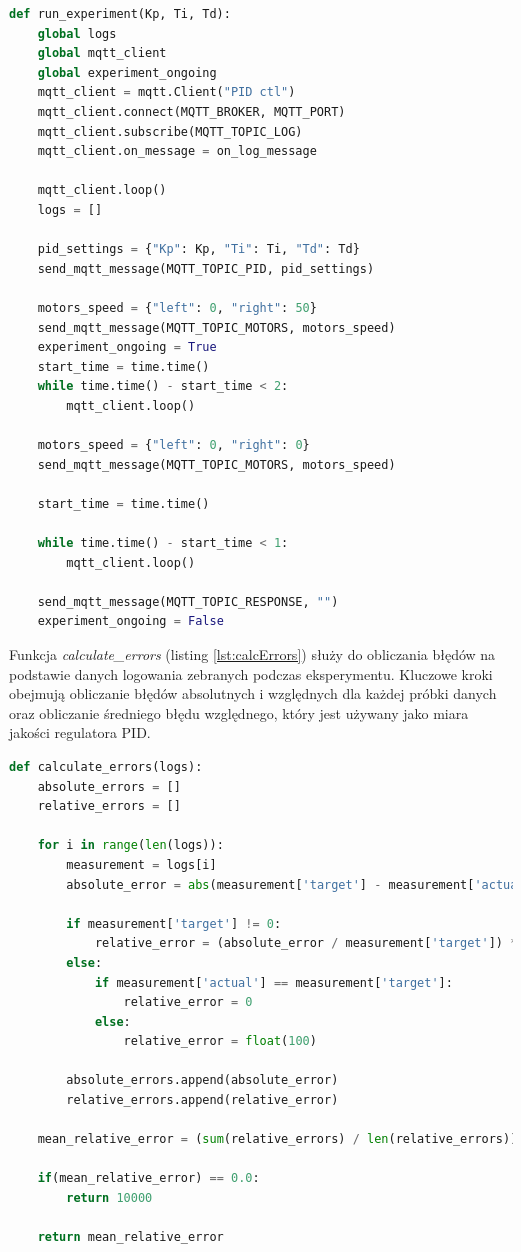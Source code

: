 \documentclass[12pt,twoside]{article}
\begin{document}
\begin{lstlisting}[language=Python, caption=Funkcja uruchamiająca eksperyment, label={lst:runExperiment}]
def run_experiment(Kp, Ti, Td):
    global logs
    global mqtt_client
    global experiment_ongoing
    mqtt_client = mqtt.Client("PID ctl")
    mqtt_client.connect(MQTT_BROKER, MQTT_PORT)
    mqtt_client.subscribe(MQTT_TOPIC_LOG)
    mqtt_client.on_message = on_log_message

    mqtt_client.loop()
    logs = []

    pid_settings = {"Kp": Kp, "Ti": Ti, "Td": Td}
    send_mqtt_message(MQTT_TOPIC_PID, pid_settings)

    motors_speed = {"left": 0, "right": 50}
    send_mqtt_message(MQTT_TOPIC_MOTORS, motors_speed)
    experiment_ongoing = True
    start_time = time.time()
    while time.time() - start_time < 2:
        mqtt_client.loop()

    motors_speed = {"left": 0, "right": 0}
    send_mqtt_message(MQTT_TOPIC_MOTORS, motors_speed)

    start_time = time.time()

    while time.time() - start_time < 1:
        mqtt_client.loop()
    
    send_mqtt_message(MQTT_TOPIC_RESPONSE, "")
    experiment_ongoing = False
\end{lstlisting}

Funkcja \textit{calculate\_errors} (listing \ref{lst:calcErrors}) służy do obliczania błędów na podstawie danych logowania zebranych podczas eksperymentu. Kluczowe kroki obejmują obliczanie błędów absolutnych i względnych dla każdej próbki danych oraz obliczanie średniego błędu względnego, który jest używany jako miara jakości regulatora PID.

\begin{lstlisting}[language=Python, caption=Funkcja obliczająca błędy, label={lst:calcErrors}]
def calculate_errors(logs):
    absolute_errors = []
    relative_errors = []

    for i in range(len(logs)):
        measurement = logs[i]
        absolute_error = abs(measurement['target'] - measurement['actual'])
        
        if measurement['target'] != 0:
            relative_error = (absolute_error / measurement['target']) * 100
        else:
            if measurement['actual'] == measurement['target']:
                relative_error = 0
            else:
                relative_error = float(100)  
        
        absolute_errors.append(absolute_error)
        relative_errors.append(relative_error)

    mean_relative_error = (sum(relative_errors) / len(relative_errors)) if(len(relative_errors)) != 0 else 10000

    if(mean_relative_error) == 0.0:
        return 10000

    return mean_relative_error
\end{lstlisting}
\end{document}
